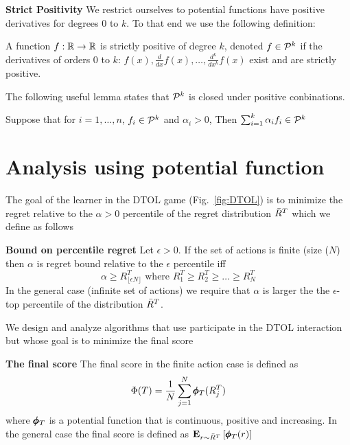 \documentclass{article}[12pt]
\begin{document}
{\bf Strict Positivity} We restrict ourselves to potential functions have
positive derivatives for degrees $0$ to $k$.  To that end we use the
following definition:
\begin{definition}
A function $f:\mathbb{R} \to \mathbb{R}$ is strictly positive of degree $k$, 
denoted $f \in {\cal P}^{k}$ if the derivatives of orders 0 to $k$:  
$f(x), \frac{d}{dx}f(x), \ldots, \frac{d^k}{dx^k}f(x)$ exist and are strictly positive.
\end{definition}
The following useful lemma states that ${\cal P}^{k}$ is closed under positive conbinations.
\begin{lemma}  \label{lemma:SP-pos-comb}
  Suppose that for $i =1,\ldots,n$, $f_i \in {\cal P}^{k}$ and $\alpha_i>0$,
  Then $\sum_{i=1}^k \alpha_i f_i \in {\cal P}^{k}$
\end{lemma}


\section{Analysis using potential function}\label{sec:PotentialGame}

The goal of the learner in the DTOL game (Fig.~\ref{fig:DTOL}) is to
minimize the regret relative to the $\alpha>0$ percentile of the
regret distribution $\bar{R}^{T}$ which we define as follows
\begin{definition}{\bf Bound on percentile regret} Let $\epsilon>0$.
  If the set of actions is finite (size ($N$) then
  $\alpha$ is regret bound relative to the $\epsilon$ percentile  iff
  \begin{equation} \label{eqn:percentile-bound}
    \alpha\geq R_{\lfloor \epsilon N\rfloor}^T \mbox{ where } R^T_1 \geq R^T_2 \geq \ldots \geq R^T_N
  \end{equation}
  In the general case (infinite set of actions) we require that
  $\alpha$ is larger the the $\epsilon$-top percentile of the
  distribution $\bar{R}^{T}$.
\end{definition}

We design and analyze algorithms that use participate in the DTOL
interaction but whose goal is to minimize the final score
\begin{definition}{\bf The final score} \label{def:averagePotential}
  The final score in the finite action case is defined as
  \begin{equation} \label{eqn:potential-bound}
    \Phi(T) = \frac{1}{N} \sum_{j=1}^N \pmb{\phi}_{T}(R^T_j)
  \end{equation}
  where $\pmb{\phi}_{T}$ is a potential function that is
  continuous, positive and increasing.
  In the general case the final score is defined as ${\bf E}_{r \sim \bar{R}^{T}}\left[ \pmb{\phi}_{T}(r) \right]$
\end{definition}
\end{document}
